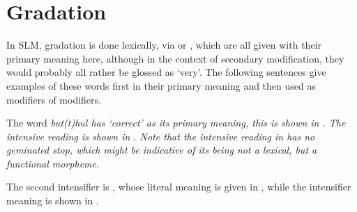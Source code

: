 \section{Gradation}\label{sec:func:Gradation}
In SLM, gradation is done lexically, via    or  \citep[67]{Saldin2001}, which are all given with their primary meaning here, although in the context of secondary modification, they would probably all rather be glossed as `very'. The following sentences give examples of these words first in their primary meaning and then used as modifiers of modifiers.

The word \em but(t)hul \em has `correct' as its primary meaning, this is shown in . The intensive reading is shown in . Note that the intensive reading in  has no geminated stop, which might be indicative of its being not a lexical, but a functional morpheme.









The second intensifier is , whose literal meaning is given in , while the intensifier meaning is shown in .

